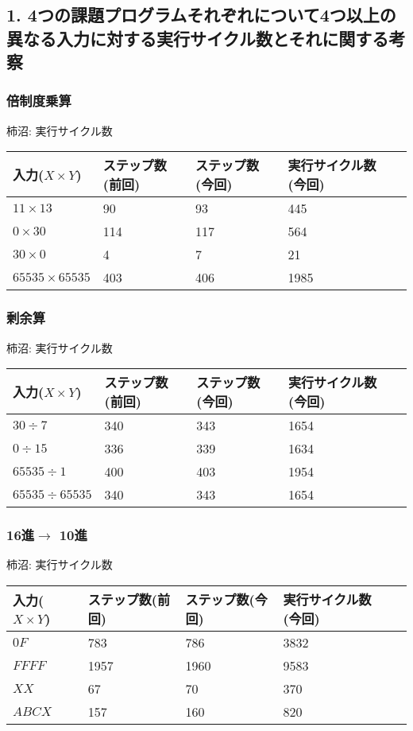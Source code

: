\documentclass{jsarticle}
\begin{document}
\subsection*{1. 4つの課題プログラムそれぞれについて4つ以上の異なる入力に対する実行サイクル数とそれに関する考察}

\subsubsection*{倍制度乗算}
柿沼:
実行サイクル数
\begin{table}[h]
  \begin{tabular}{|l|l|l|l|l|} \hline
    入力($X \times Y$) & ステップ数(前回) & ステップ数(今回) & 実行サイクル数(今回) \\ \hline
    $11 \times 13$ & 90 & 93 & 445\\ \hline
    $0 \times 30$ & 114 & 117 & 564 \\ \hline
    $30 \times 0$ & 4 & 7 & 21\\ \hline
    $65535 \times 65535$ & 403 & 406 & 1985 \\ \hline
  \end{tabular}
\end{table}

\subsubsection*{剰余算}
柿沼:
実行サイクル数
\begin{table}[h]
  \begin{tabular}{|l|l|l|l|l|} \hline
    入力($X \times Y$) & ステップ数(前回) & ステップ数(今回) & 実行サイクル数(今回) \\ \hline
    $30 \div 7$ & 340 & 343 & 1654 \\ \hline
    $0 \div 15$ & 336 & 339 & 1634 \\ \hline
    $65535 \div 1$ & 400 & 403 & 1954 \\ \hline
    $65535 \div 65535$ & 340 & 343 & 1654 \\ \hline
  \end{tabular}
\end{table}

\newpage

\subsubsection*{16進$\rightarrow$ 10進}
柿沼:
実行サイクル数
\begin{table}[h]
  \begin{tabular}{|l|l|l|l|l|} \hline
    入力($X \times Y$) & ステップ数(前回) & ステップ数(今回) & 実行サイクル数(今回) \\ \hline
    $0F$ & 783 & 786 & 3832 \\ \hline
    $FFFF$ & 1957 & 1960 & 9583 \\ \hline
    $XX$ & 67 & 70 & 370 \\ \hline
    $ABCX$ & 157 & 160 & 820 \\ \hline
  \end{tabular}
\end{table}
\end{document}
